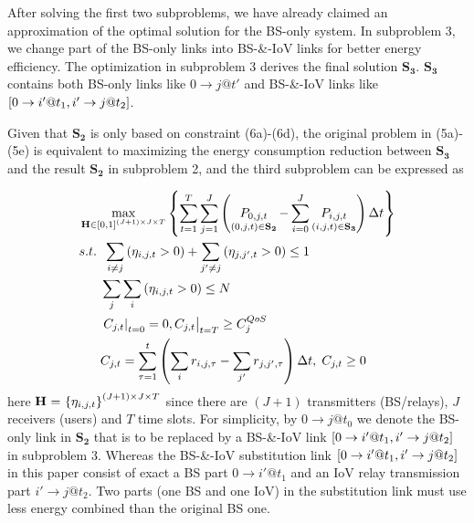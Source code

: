 \documentclass{ieeeaccess}
\begin{document}
After solving the first two subproblems, we have already claimed an approximation of the optimal solution for the BS-only system. 
In subproblem 3, we change part of the BS-only links into BS-\&-IoV links for better energy efficiency. The optimization in subproblem 3 derives the final solution ${{\mathbf{S}}_{\mathbf{3}}}$. ${{\mathbf{S}}_{\mathbf{3}}}$ contains both BS-only links like $0 \to j@t'$ and BS-\&-IoV links like $\left[ {{\rm{0}} \to i'@{t_1},i' \to j@{t_2}} \right]$.

Given that ${{\mathbf{S}}_{\mathbf{2}}}$ is only based on constraint (6a)-(6d), the original problem in (5a)-(5e) is equivalent to maximizing the energy consumption reduction between ${{\mathbf{S}}_{\mathbf{3}}}$ and the result ${{\mathbf{S}}_{\mathbf{2}}}$ in subproblem 2, and the third subproblem can be expressed as

\begin{subequations}
\begin{align}
& \mathop {\max }\limits_{{\mathbf{{\rm H}}} \in {{\left[ {0,1} \right]}^{\left( {J + 1} \right) \times J \times T}}} \left\{ {\sum\limits_{t = 1}^T {\sum\limits_{j = 1}^J {\left( {\mathop {{P_{0,j,t}}}\limits_{\left( {0,j,t} \right) \in {{\mathbf{S}}_{\mathbf{2}}}}  - \sum\limits_{i = 0}^J {\mathop {{P_{i,j,t}}}\limits_{\left( {i,j,t} \right) \in {{\mathbf{S}}_{\mathbf{3}}}} } } \right)\Delta t} } } \right\} \\
& {s.t.} \;\; \sum\limits_{i \ne j} {\left( {{\eta _{i,j,t}} > 0} \right)}  + \sum\limits_{j' \ne j} {\left( {{\eta _{j,j',t}} > 0} \right) \le {\text{1}}} \\
& \;\;\;\;\;\; \sum\limits_j {\sum\limits_i {\left( {{\eta _{i,j,t}} > 0} \right)} }  \le N \\
& \;\;\;\;\;\; {\left. {{{\left. {{C_{j,t}}} \right|}_{t = 0}} = 0, {C_{j,t}}} \right|_{t = T}} \ge C_j^{QoS} \\
& \;\;\;\;\;\; {C_{j,t}} = \sum\limits_{\tau  = 1}^t {\left( {\sum\limits_i {{r_{i,j,\tau }}}  - \sum\limits_{j'} {{r_{j,j',\tau }}} } \right)\Delta t} ,\; {C_{j,t}} \ge 0
\end{align}
\end{subequations}
here ${\mathbf{{\rm H}}}{\text{ = }}{\left\{ {{\eta _{i,j,t}}} \right\}^{\left( {J + 1} \right) \times J \times T}}$ since 
there are $\left( {J + 1} \right)$ transmitters (BS/relays), $J$ receivers (users) and $T$ time slots. For simplicity, by $0 \to j@{t_0}$ we denote the BS-only link in ${{\mathbf{S}}_{\mathbf{2}}}$ that is to be replaced by a BS-\&-IoV link $\left[ {{\rm{0}} \to i'@{t_1},i' \to j@{t_2}} \right]$ in subproblem 3. Whereas the BS-\&-IoV substitution link $\left[ {{\rm{0}} \to i'@{t_1},i' \to j@{t_2}} \right]$ in this paper consist of exact a BS part $0 \to i'@{t_1}$ and an IoV relay transmission part $i' \to j@{t_2}$. Two parts (one BS and one IoV) in the substitution link must use less energy combined than the original BS one.
\end{document}
